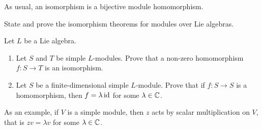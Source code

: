 As usual, an isomorphism is a bijective module homomorphism. 

\begin{exercise}
    State and prove the isomorphism theorems for modules
    over Lie algebras. 
\end{exercise}

\begin{exercise}
    Let $L$ be a Lie algebra.
    \begin{enumerate}
        \item Let $S$ and $T$ be simple $L$-modules.
            Prove that a non-zero homomorphism $f\colon S\to T$ 
            is an isomorphism.
        \item Let $S$ be a finite-dimensional simple $L$-module. 
            Prove that if $f\colon S\to S$ is a homomorphism, then
                $f=\lambda\operatorname{id}$ for some $\lambda\in\mathbb{C}$. 
    \end{enumerate} 
\end{exercise}

As an example, if $V$ is a simple module, then $z$
acts by scalar multiplication on $V$, that is
$zv=\lambda v$ for some $\lambda\in\mathbb{C}$. 
